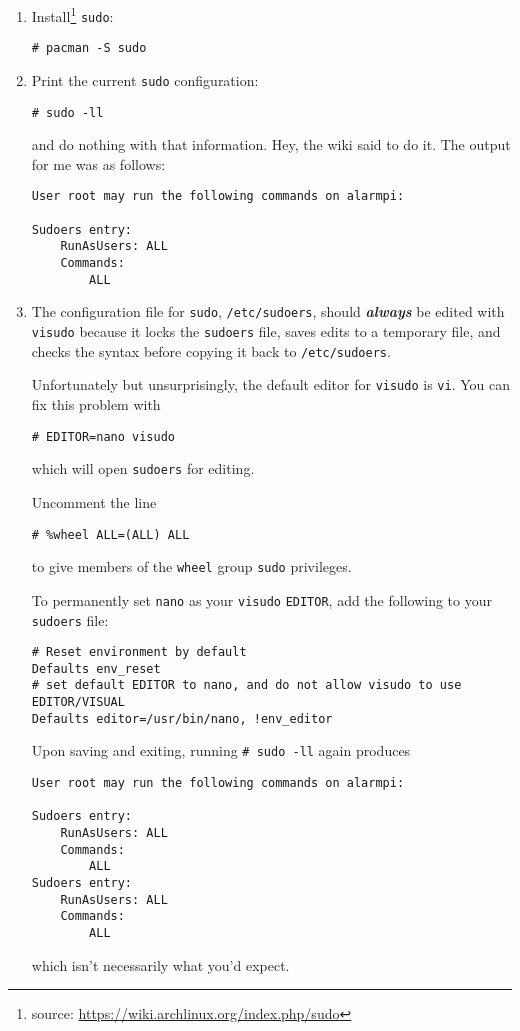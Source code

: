 \documentclass[12pt,letterpaper]{article}
\newcommand\EMPH[1]{\textbf{\textit{#1}}}
\begin{document}
\begin{enumerate}
\item Install\footnote{source: \url{https://wiki.archlinux.org/index.php/sudo}} \lstinline{sudo}:
\begin{lstlisting}
# pacman -S sudo
\end{lstlisting}

\item Print the current \lstinline{sudo} configuration:
\begin{lstlisting}
# sudo -ll
\end{lstlisting}
and do nothing with that information.  Hey, the wiki said to do it.  The output for me was as follows:
\begin{lstlisting}[basicstyle=\ttfamily\small]
User root may run the following commands on alarmpi:

Sudoers entry:
    RunAsUsers: ALL
    Commands:
        ALL
\end{lstlisting}

\item The configuration file for \lstinline{sudo}, \lstinline{/etc/sudoers}, should \EMPH{always} be edited with \lstinline{visudo} because it locks the \lstinline{sudoers} file, saves edits to a temporary file, and checks the syntax before copying it back to \lstinline{/etc/sudoers}.

Unfortunately but unsurprisingly, the default editor for \lstinline{visudo} is \lstinline{vi}.  You can fix this problem with
\begin{lstlisting}
# EDITOR=nano visudo
\end{lstlisting}
which will open \lstinline{sudoers} for editing.

Uncomment the line
\begin{lstlisting}
# %wheel ALL=(ALL) ALL
\end{lstlisting}
to give members of the \lstinline{wheel} group \lstinline{sudo} privileges.

To permanently set \lstinline{nano} as your \lstinline{visudo} \lstinline{EDITOR}, add the following to your \lstinline{sudoers} file:
\begin{lstlisting}
# Reset environment by default
Defaults env_reset
# set default EDITOR to nano, and do not allow visudo to use EDITOR/VISUAL
Defaults editor=/usr/bin/nano, !env_editor
\end{lstlisting}

Upon saving and exiting, running \lstinline{# sudo -ll} again produces
\begin{lstlisting}[basicstyle=\ttfamily\small]
User root may run the following commands on alarmpi:

Sudoers entry:
    RunAsUsers: ALL
    Commands:
        ALL
Sudoers entry:
    RunAsUsers: ALL
    Commands:
        ALL
\end{lstlisting}
which isn't necessarily what you'd expect.

\end{enumerate}
\end{document}
